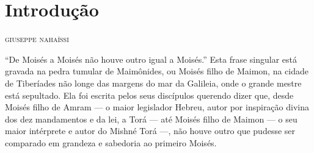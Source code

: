 %
%
%
%

\chapter{Introdução}

\begin{flushright}
\textsc{giuseppe nahaïssi}
\end{flushright}

\noindent{}``De Moisés a Moisés não houve outro igual a Moisés.'' Esta frase
singular está gravada na pedra tumular de Maimônides, ou Moisés filho
de Maimon, na cidade de Tiberíades não longe das margens do mar da
Galileia, onde o grande mestre está sepultado. Ela foi escrita pelos
seus discípulos querendo dizer que, desde Moisés filho de Amram --- o
maior legislador Hebreu, autor por inspiração divina dos dez mandamentos
e da lei, a Torá --- até Moisés filho de Maimon --- o seu maior
intérprete e autor do Mishné Torá ---, não houve outro que
pudesse ser comparado em grandeza e sabedoria ao primeiro Moisés.

